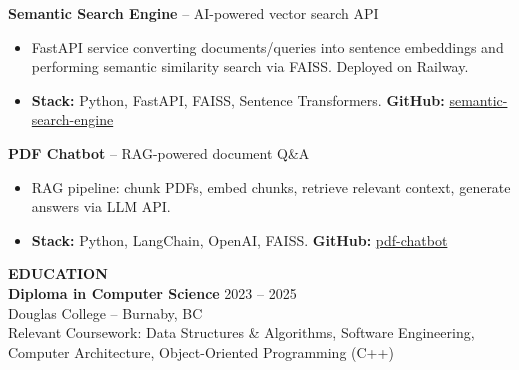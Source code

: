 \documentclass[10pt,letterpaper]{article}
\begin{document}
\vspace{3pt}

\textbf{Semantic Search Engine} -- AI-powered vector search API
\begin{itemize}
    \item FastAPI service converting documents/queries into sentence embeddings and performing semantic similarity search via FAISS. Deployed on Railway.
    \item \textbf{Stack:} Python, FastAPI, FAISS, Sentence Transformers. \textbf{GitHub:} \href{https://github.com/parsasamandi/semantic-search-engine}{semantic-search-engine}
\end{itemize}

\vspace{3pt}

\textbf{PDF Chatbot} -- RAG-powered document Q\&A
\begin{itemize}
    \item RAG pipeline: chunk PDFs, embed chunks, retrieve relevant context, generate answers via LLM API.
    \item \textbf{Stack:} Python, LangChain, OpenAI, FAISS. \textbf{GitHub:} \href{https://github.com/parsasamandi/pdf-chatbot}{pdf-chatbot}
\end{itemize}

\vspace{5pt}

\textbf{EDUCATION}\\[4pt]

\textbf{Diploma in Computer Science} \hfill 2023 -- 2025\\
Douglas College -- Burnaby, BC \\
Relevant Coursework: Data Structures \& Algorithms, Software Engineering, Computer Architecture, Object-Oriented Programming (C++)
\end{document}

